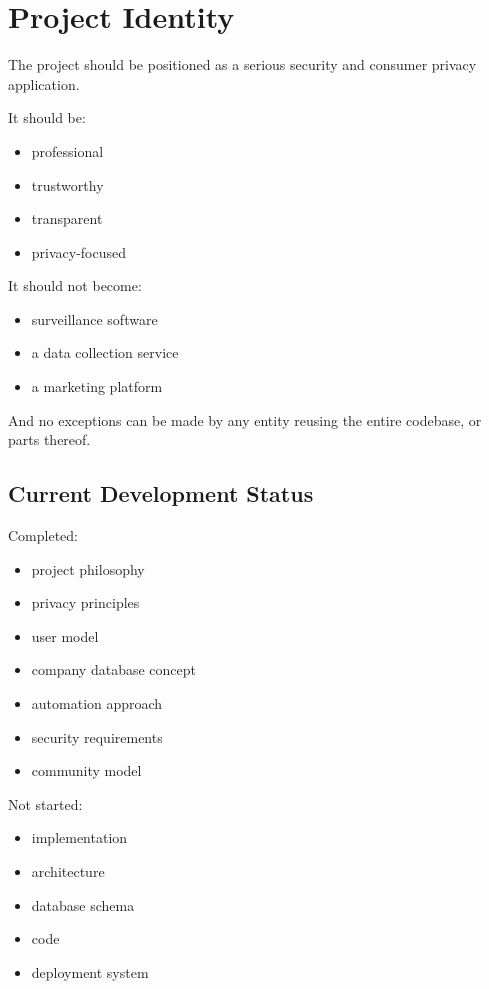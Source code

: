 
\chapter{Project Identity}

The project should be positioned as a serious security and consumer privacy application.

It should be:
\begin{itemize}
	\item professional
	\item trustworthy
	\item transparent
	\item privacy-focused
\end{itemize}

It should not become:
\begin{itemize}
	\item surveillance software
	\item a data collection service
	\item a marketing platform
\end{itemize}

And no exceptions can be made by any entity reusing the entire codebase, or parts thereof.

\section{Current Development Status}
Completed:
\begin{itemize}
	\item project philosophy
	\item privacy principles
	\item user model
	\item company database concept
	\item automation approach
	\item security requirements
	\item community model
\end{itemize}

Not started:
\begin{itemize}
	\item implementation
	\item architecture
	\item database schema
	\item code
	\item deployment system
\end{itemize}



\sentinelchapterend
